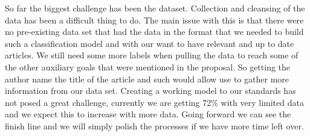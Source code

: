 So far the biggest challenge has been the dataset. 
Collection and cleansing of the data has been a difficult thing to do. 
The main issue with this is that there were no pre-existing data set that had the data in the format that we needed to build such a classification model and with our want to have relevant and up to date articles.
We still need some more labels when pulling the data to reach some of the other auxiliary goals that were mentioned in the proposal. So getting the author name the title of the article and such would allow use to gather more information from our data set.
Creating a working model to our standards has not posed a great challenge, currently we are getting 72\% with very limited data and we expect this to increase with more data.
Going forward we can see the finish line and we will simply polish the processes if we have more time left over. 

